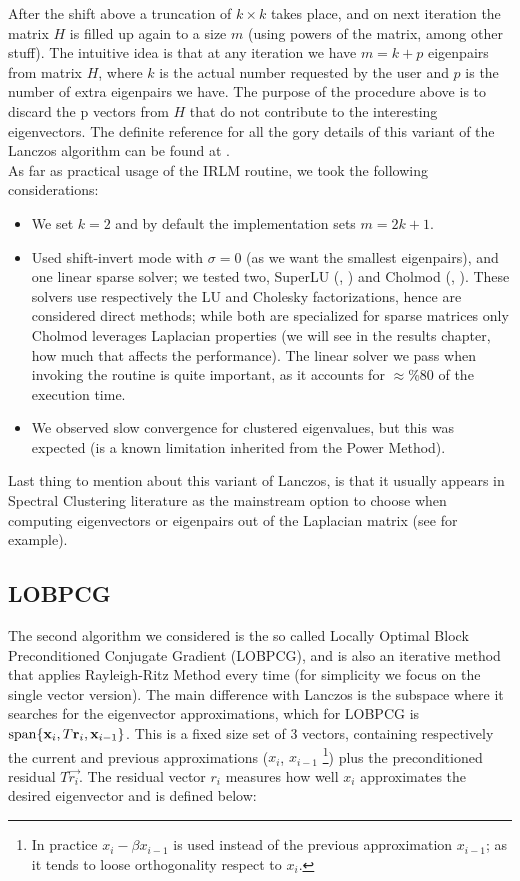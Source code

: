 After the shift above a truncation of $k \times k$ takes place, and on
next iteration the matrix $H$ is filled up again to a size $m$ (using
powers of the matrix, among other stuff). The intuitive idea is that
at any iteration we have $m = k + p$ eigenpairs from matrix $H$, where
$k$ is the actual number requested by the user and $p$ is the number
of extra eigenpairs we have. The purpose of the procedure above is to 
discard the p vectors from $H$ that do not contribute to the
interesting eigenvectors. The definite reference for all the gory
details of this variant of the Lanczos algorithm can be found at
\cite{arpack}. \\

As far as practical usage of the IRLM routine, we took the following
considerations:

\begin{itemize}
\item We set $k=2$ and by default the implementation sets $m=2k+1$.
\item Used shift-invert mode with $\sigma=0$ (as we want the smallest
  eigenpairs), and one linear sparse solver; we tested two, SuperLU
  (\cite{superlu97}, \cite{superlu05}) and  Cholmod (\cite{cholmod08},
  \cite{cholmod08a}). These solvers use respectively the LU and
  Cholesky factorizations, hence are considered direct methods; while
  both are specialized for sparse matrices only Cholmod leverages
  Laplacian properties (we will see in the results chapter, how much
  that affects the performance). The linear solver we pass when invoking the
  routine is quite important, as it accounts for $\approx \%80$ of
  the execution time.
\item We observed slow convergence for clustered eigenvalues, but this
  was expected (is a known limitation inherited from the Power
  Method).
\end{itemize}

Last thing to mention about this variant of Lanczos, is that it
usually appears in Spectral Clustering literature as the mainstream
option to choose when computing eigenvectors or eigenpairs out of the
Laplacian matrix (see \cite{luxburg07} for example). 

\subsection{LOBPCG}

The second algorithm we considered is the so called Locally Optimal
Block Preconditioned Conjugate Gradient (LOBPCG), and is also an
iterative method that applies Rayleigh-Ritz Method every time (for
simplicity we focus on the single vector version). The main difference
with Lanczos is the subspace where it searches for the eigenvector
approximations, which for LOBPCG is $\operatorname{span} \{\mathbf{x}_i,
T\mathbf{r}_i, \mathbf{x}_{i-1}\}$. This is a fixed size set of 3 vectors,
containing respectively the current and previous approximations
($x_i$, $x_{i-1}$ \footnote{In practice $x_{i} - \beta x_{i-1}$ is used
  instead of the previous approximation $x_{i-1}$; as it tends to
  loose orthogonality respect to $x_i$.}) plus the preconditioned
residual $T\vec{r_i}$. The residual vector $r_i$ measures how well
$x_i$ approximates the desired eigenvector and is defined below:

